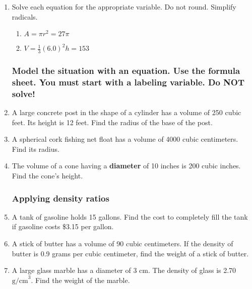 \documentclass[12pt, twoside]{article}
\begin{document}
\begin{enumerate}
  \item Solve each equation for the appropriate variable. Do not round. Simplify radicals.
  \begin{multicols}{2}
  \begin{enumerate}[itemsep=2cm]
    \item $A=\pi r^2=27\pi$
    \item $V=\frac{1}{3}(6.0)^2h=153$  
  \end{enumerate}
  \end{multicols}\vspace{5cm}

  \subsubsection*{Model the situation with an equation. Use the formula sheet. You must start with a labeling variable. \hfill Do NOT solve!}

  \item A large concrete post in the shape of a cylinder has a volume of 250 cubic feet. Its height is 12 feet. Find the radius of the base of the post. \vspace{2cm}

  \item A spherical cork fishing net float has a volume of 4000 cubic centimeters. Find its radius. \vspace{2cm}

  \item The volume of a cone having a \textbf{diameter} of 10 inches is 200 cubic inches. Find the cone's height. \vspace{2cm}

  \newpage
  \subsubsection*{Applying density ratios}
  \item A tank of gasoline holds 15 gallons. Find the cost to completely fill the tank if gasoline costs \$3.15 per gallon. \vspace{3cm}
  \item A stick of butter has a volume of 90 cubic centimeters. If the density of butter is 0.9 grams per cubic centimeter, find the weight of a stick of butter. \vspace{3cm}
  \item A large glass marble has a diameter of 3 cm. The density of glass is 2.70 $\mathrm{g/cm}^3$. Find the weight of the marble. \vspace{3cm}


\end{enumerate}
\end{document}
